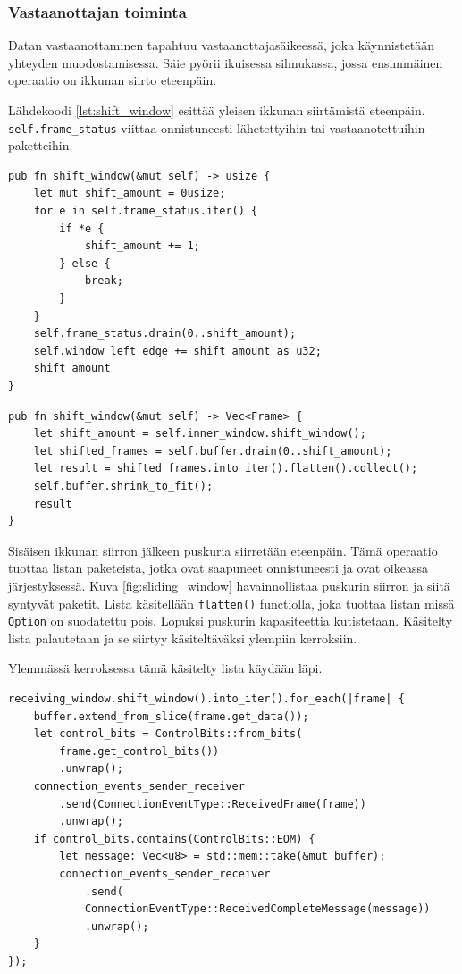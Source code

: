 \documentclass[a4paper,12pt]{article}
\begin{document}
    \subsubsection{Vastaanottajan toiminta}
    Datan vastaanottaminen tapahtuu vastaanottajasäikeessä, joka käynnistetään yhteyden muodostamisessa.
    Säie pyörii ikuisessa silmukassa, jossa ensimmäinen operaatio on ikkunan siirto eteenpäin.

    Lähdekoodi \ref{lst:shift_window} esittää yleisen ikkunan siirtämistä eteenpäin.
    \lstinline{self.frame_status} viittaa onnistuneesti lähetettyihin tai vastaanotettuihin paketteihin.

    \begin{lstlisting}[caption={Ikkunan siirto}, label={lst:shift_window}]
pub fn shift_window(&mut self) -> usize {
    let mut shift_amount = 0usize;
    for e in self.frame_status.iter() {
        if *e {
            shift_amount += 1;
        } else {
            break;
        }
    }
    self.frame_status.drain(0..shift_amount);
    self.window_left_edge += shift_amount as u32;
    shift_amount
}\end{lstlisting}


    \begin{lstlisting}[caption={Vastaanottajan ikkunan siirto}, label={lst:shift_rwindow}]
pub fn shift_window(&mut self) -> Vec<Frame> {
    let shift_amount = self.inner_window.shift_window();
    let shifted_frames = self.buffer.drain(0..shift_amount);
    let result = shifted_frames.into_iter().flatten().collect();
    self.buffer.shrink_to_fit();
    result
}\end{lstlisting}

    Sisäisen ikkunan siirron jälkeen puskuria siirretään eteenpäin. Tämä operaatio tuottaa
    listan paketeista, jotka ovat saapuneet onnistuneesti ja ovat oikeassa järjestyksessä. Kuva \ref{fig:sliding_window} havainnollistaa puskurin siirron ja siitä syntyvät paketit.
    Lista käsitellään \lstinline{flatten()} functiolla, joka tuottaa listan missä \lstinline{Option}
    on suodatettu pois. Lopuksi puskurin kapasiteettia kutistetaan. Käsitelty lista palautetaan ja se siirtyy käsiteltäväksi ylempiin kerroksiin. \par

    Ylemmässä kerroksessa tämä käsitelty lista käydään läpi.

    \begin{lstlisting}[caption={Pakettien käsittely}, label={lst:handle_shift_window}]
receiving_window.shift_window().into_iter().for_each(|frame| {
    buffer.extend_from_slice(frame.get_data());
    let control_bits = ControlBits::from_bits(
        frame.get_control_bits())
        .unwrap();
    connection_events_sender_receiver
        .send(ConnectionEventType::ReceivedFrame(frame))
        .unwrap();
    if control_bits.contains(ControlBits::EOM) {
        let message: Vec<u8> = std::mem::take(&mut buffer);
        connection_events_sender_receiver
            .send(
            ConnectionEventType::ReceivedCompleteMessage(message))
            .unwrap();
    }
});\end{lstlisting}
\end{document}
